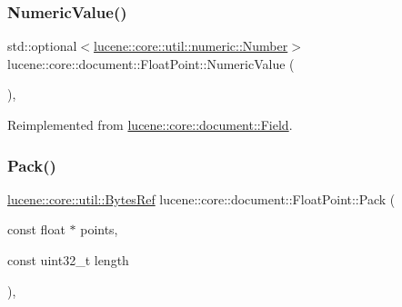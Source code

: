 \subsubsection{\texorpdfstring{Numeric\+Value()}{NumericValue()}}
{\footnotesize\ttfamily std\+::optional$<$\mbox{\hyperlink{classlucene_1_1core_1_1util_1_1numeric_1_1Number}{lucene\+::core\+::util\+::numeric\+::\+Number}}$>$ lucene\+::core\+::document\+::\+Float\+Point\+::\+Numeric\+Value (\begin{DoxyParamCaption}{ }\end{DoxyParamCaption})\hspace{0.3cm}{\ttfamily [inline]}, {\ttfamily [virtual]}}



Reimplemented from \mbox{\hyperlink{classlucene_1_1core_1_1document_1_1Field_a858814043215c98bacf6ecc823d078ea}{lucene\+::core\+::document\+::\+Field}}.

\mbox{\label{classlucene_1_1core_1_1document_1_1FloatPoint_ad3370170ead68941120b8f8c7af1aaa2}} 
\subsubsection{\texorpdfstring{Pack()}{Pack()}}
{\footnotesize\ttfamily \mbox{\hyperlink{classlucene_1_1core_1_1util_1_1BytesRef}{lucene\+::core\+::util\+::\+Bytes\+Ref}} lucene\+::core\+::document\+::\+Float\+Point\+::\+Pack (\begin{DoxyParamCaption}\item[{const float $\ast$}]{points,  }\item[{const uint32\+\_\+t}]{length }\end{DoxyParamCaption})\hspace{0.3cm}{\ttfamily [inline]}, {\ttfamily [private]}}

\mbox{\label{classlucene_1_1core_1_1document_1_1FloatPoint_a8862567e2ebfd0b8192eaec0967a943a}} 
